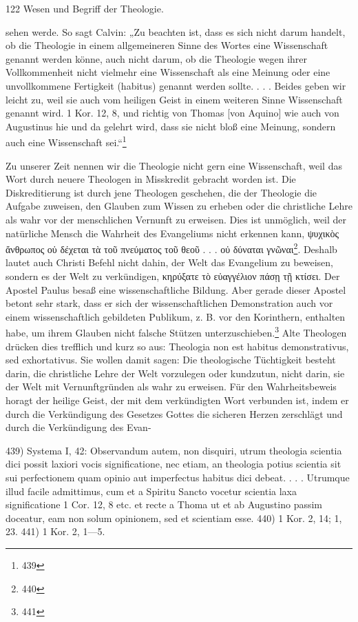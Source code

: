 122
\noindent Wesen und Begriff der Theologie.

sehen werde. So sagt Calvin: „Zu beachten ist, dass es sich nicht darum handelt, ob die Theologie in einem allgemeineren Sinne des Wortes eine Wissenschaft genannt werden könne, auch nicht darum, ob die Theologie wegen ihrer Vollkommenheit nicht vielmehr eine Wissenschaft als eine Meinung oder eine unvollkommene Fertigkeit (habitus) genannt werden sollte. . . . Beides geben wir leicht zu, weil sie auch vom heiligen Geist in einem weiteren Sinne Wissenschaft genannt wird. 1 Kor. 12, 8, und richtig von Thomas [von Aquino] wie auch von Augustinus hie und da gelehrt wird, dass sie nicht bloß eine Meinung, sondern auch eine Wissenschaft sei.“\footnote{439}

Zu unserer Zeit nennen wir die Theologie nicht gern eine Wissenschaft, weil das Wort durch neuere Theologen in Misskredit gebracht worden ist. Die Diskreditierung ist durch jene Theologen geschehen, die der Theologie die Aufgabe zuweisen, den Glauben zum Wissen zu erheben oder die christliche Lehre als wahr vor der menschlichen Vernunft zu erweisen. Dies ist unmöglich, weil der natürliche Mensch die Wahrheit des Evangeliums nicht erkennen kann, \textgreek{ψυχικὸς ἄνθρωπος οὐ δέχεται τὰ τοῦ πνεύματος τοῦ θεοῦ . . . οὐ δύναται γνῶναι}\footnote{440}. Deshalb lautet auch Christi Befehl nicht dahin, der Welt das Evangelium zu beweisen, sondern es der Welt zu verkündigen, \textgreek{κηρύξατε τὸ εὐαγγέλιον πάσῃ τῇ κτίσει}. Der Apostel Paulus besaß eine wissenschaftliche Bildung. Aber gerade dieser Apostel betont sehr stark, dass er sich der wissenschaftlichen Demonstration auch vor einem wissenschaftlich gebildeten Publikum, z. B. vor den Korinthern, enthalten habe, um ihrem Glauben nicht falsche Stützen unterzuschieben.\footnote{441} Alte Theologen drücken dies trefflich und kurz so aus: Theologia non est habitus demonstrativus, sed exhortativus. Sie wollen damit sagen: Die theologische Tüchtigkeit besteht darin, die christliche Lehre der Welt vorzulegen oder kundzutun, nicht darin, sie der Welt mit Vernunftgründen als wahr zu erweisen. Für den Wahrheitsbeweis horagt der heilige Geist, der mit dem verkündigten Wort verbunden ist, indem er durch die Verkündigung des Gesetzes Gottes die sicheren Herzen zerschlägt und durch die Verkündigung des Evan-

\footnotesize
439) Systema I, 42: Observandum autem, non disquiri, utrum theologia scientia dici possit laxiori vocis significatione, nec etiam, an theologia potius scientia sit sui perfectionem quam opinio aut imperfectus habitus dici debeat. . . . Utrumque illud facile admittimus, cum et a Spiritu Sancto vocetur scientia laxa significatione 1 Cor. 12, 8 etc. et recte a Thoma ut et ab Augustino passim doceatur, eam non solum opinionem, sed et scientiam esse.
440) 1 Kor. 2, 14; 1, 23.
441) 1 Kor. 2, 1—5.
\normalsize